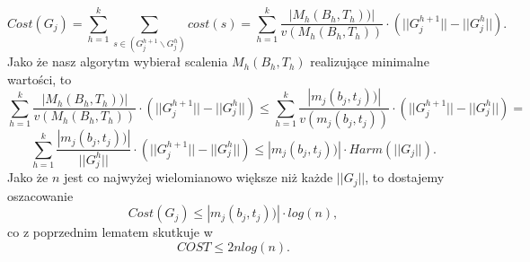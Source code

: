 \documentclass[12pt]{article}
\theoremstyle{plain}
\begin{document}
$$Cost(G_j) = \sum_{h=1}^{k} \sum_{s \in (G_j^{h+1} \backslash G_j^{h})} cost(s) = \sum_{h=1}^{k} \frac{|M_h(B_h, T_h))|}{v(M_h(B_h, T_h))} \cdot (||G_j^{h+1}|| - ||G_j^{h}||).$$
Jako że nasz algorytm wybierał scalenia $M_h(B_h, T_h)$ realizujące minimalne wartości, to
$$\sum_{h=1}^{k} \frac{|M_h(B_h, T_h))|}{v(M_h(B_h, T_h))} \cdot (||G_j^{h+1}|| - ||G_j^{h}||) \leq \sum_{h=1}^{k} \frac{|m_j(b_j, t_j))|}{v(m_j(b_j, t_j))} \cdot (||G_j^{h+1}|| - ||G_j^{h}||) = $$
$$\sum_{h=1}^{k} \frac{|m_j(b_j, t_j))|}{||G_j^{h}||} \cdot (||G_j^{h+1}|| - ||G_j^{h}||) \leq |m_j(b_j, t_j))| \cdot Harm(||G_j||).$$
Jako że $n$ jest co najwyżej wielomianowo większe niż każde $||G_j||$, to dostajemy oszacowanie
$$Cost(G_j) \leq |m_j(b_j, t_j))| \cdot log(n),$$
co z poprzednim lematem skutkuje w
$$COST \leq 2nlog(n).$$
\end{document}
